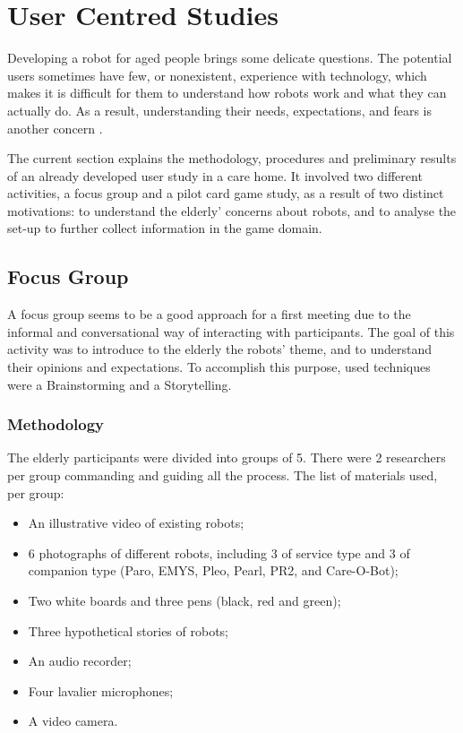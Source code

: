 \section{User Centred Studies} \label{sec:user-studies}

Developing a robot for aged people brings some delicate questions.
The potential users sometimes have few, or nonexistent, experience with technology, which makes it is difficult for them to understand how robots work and what they can actually do.
As a result, understanding their needs, expectations, and fears is another concern \cite{Oliveira}.


The current section explains the methodology, procedures and preliminary results of an already developed user study in a care home.
It involved two different activities, a focus group and a pilot card game study, as a result of two distinct motivations: to understand the elderly' concerns about robots, and to analyse the set-up to further collect information in the game domain.






\subsection{Focus Group}

A focus group seems to be a good approach for a first meeting due to the informal and conversational way of interacting with participants.
The goal of this activity was to introduce to the elderly the robots' theme, and to understand their opinions and expectations.
To accomplish this purpose, used techniques were a Brainstorming and a Storytelling.

\subsubsection{Methodology}
The elderly participants were divided into groups of 5.
There were 2 researchers per group commanding and guiding all the process.
The list of materials used, per group:

\begin{itemize}
\item An illustrative video of existing robots;
\item 6 photographs of different robots, including 3 of service type and 3 of companion type (Paro, EMYS, Pleo, Pearl, PR2, and Care-O-Bot);
\item Two white boards and three pens (black, red and green);
\item Three hypothetical stories of robots;
\item An audio recorder;
\item Four lavalier microphones;
\item A video camera.
\end{itemize}

